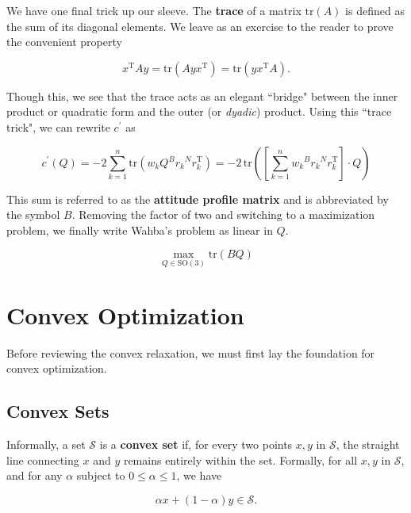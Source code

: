 \documentclass[12pt]{article}
\begin{document}
	We have one final trick up our sleeve.  The \textbf{trace} of a matrix \( \mathrm{tr}(A) \) is defined as the sum of its diagonal elements.  We leave as an exercise to the reader to prove the convenient property
	
	\begin{equation*}
		x^\mathrm{T} A y = \mathrm{tr}(A y x^\mathrm{T}) = \mathrm{tr}(y x^\mathrm{T} A) .
	\end{equation*}
	
	Though this, we see that the trace acts as an elegant ``bridge" between the inner product or quadratic form and the outer (or \textit{dyadic}) product.  Using this ``trace trick", we can rewrite \( c^\prime \) as
	
	\begin{equation*}
		c^\prime(Q) = -2 \sum_{k=1}^n \mathrm{tr}\left( w_k Q {}^B r_k {}^N r_k^\mathrm{T} \right) = -2 \, \mathrm{tr}\left( \left[ \sum_{k=1}^n w_k {}^B r_k {}^N r_k^\mathrm{T} \right] \cdot Q \right)
	\end{equation*}
	
	This sum is referred to as the \textbf{attitude profile matrix} and is abbreviated by the symbol \( B \).  Removing the factor of two and switching to a maximization problem, we finally write Wahba's problem as linear in \( Q \).
	
	\begin{equation}
		\boxed{ \max_{Q \in \mathrm{SO(3)}} \mathrm{tr}\left( B Q \right) }
	\end{equation}
	
	\section{Convex Optimization}
	
	Before reviewing the convex relaxation, we must first lay the foundation for convex optimization.
	
	\subsection{Convex Sets}
	
	Informally, a set \( \mathcal{S} \) is a \textbf{convex set} if, for every two points \( x, y \) in \( \mathcal{S} \), the straight line connecting \( x \) and \( y \) remains entirely within the set.  Formally, for all \( x, y \) in \( \mathcal{S} \), and for any \( \alpha \) subject to \( 0 \le \alpha \le 1 \), we have
	
	\begin{equation*}
		\alpha x + (1 - \alpha) y \in \mathcal{S} .
	\end{equation*}
	
\end{document}

